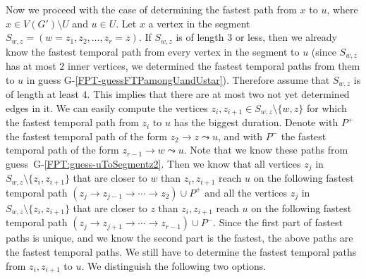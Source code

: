 \documentclass[a4paper,UKenglish,cleveref, autoref, thm-restate]{lipics-v2021}
\begin{document}
Now we proceed with the case of determining the fastest path from $x$ to $u$, where $x \in V(G') \setminus U$ and $u \in U$.
Let $x$ a vertex in the segment $S_{w,z} = (w=z_1,z_2, \dots, z_r = z)$.
If $S_{w,z}$ is of length $3$ or less, then we already know the fastest temporal path from every vertex in the segment to $u$ 
(since $S_{w,z}$ has at most $2$ inner vertices, we determined the fastest temporal paths from them to $u$ in guess G-\ref{FPT-guessFTPamongUandUstar}).
Therefore assume that $S_{w,z}$ is of length at least $4$.
This implies that there are at most two not yet determined edges in it.
We can easily compute the vertices $z_i, z_{i+1} \in S_{w,z}\setminus\{w,z\}$ for which the fastest temporal path from $z_i$ to $u$ has the biggest duration.
Denote with $P^+$ the fastest temporal path of the form $z_2 \rightarrow z \leadsto u$,
and with $P^-$ the fastest temporal path of the form $z_{r-1} \rightarrow w \leadsto u$.
Note that we know these paths from guess~G-\ref{FPT:guess-uToSegmentz2}.
Then we know that all vertices $z_j$ in $S_{w,z} \setminus\{z_i,z_{i+1}\}$ that are closer to $w$ than $z_i,z_{i+1}$ reach $u$ on the 
following fastest temporal path $(z_j \rightarrow z_{j-1} \rightarrow \cdots \rightarrow z_2) \cup P^+$ 
and
all the vertices $z_j$ in $S_{w,z}\setminus\{z_i,z_{i+1}\}$ that are closer to $z$ than $z_i, z_{i+1}$ reach $u$ on the 
following fastest temporal path
$(z_j \rightarrow z_{j+1} \rightarrow \cdots \rightarrow z_{r-1}) \cup P^-$.
Since the first part of fastest paths is unique, and we know the second part is the fastest, the above paths are the fastest temporal paths.
We still have to determine the fastest temporal paths from $z_i,z_{i+1}$ to $u$.
We distinguish the following two options.
\end{document}
